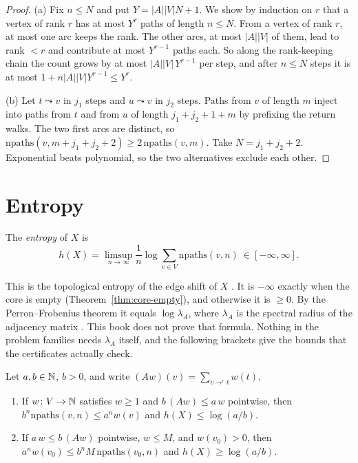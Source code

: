 \begin{proof}
(a) Fix \(n\le N\) and put \(Y=|A||V|N+1\). We show by induction on \(r\) that a vertex of rank
\(r\) has at most \(Y^r\) paths of length \(n\le N\). From a vertex of rank \(r\), at most one
arc keeps the rank. The other arcs, at most \(|A||V|\) of them, lead to rank \(<r\) and
contribute at most \(Y^{r-1}\) paths each. So along the rank-keeping chain the count grows by
at most \(|A||V|\,Y^{r-1}\) per step, and after \(n\le N\) steps it is at most
\(1+n|A||V|Y^{r-1}\le Y^r\).

(b) Let \(t\leadsto v\) in \(j_1\) steps and \(u\leadsto v\) in \(j_2\) steps. Paths from
\(v\) of length \(m\) inject into paths from \(t\) and from \(u\) of length \(j_1+j_2+1+m\) by
prefixing the return walks. The two first arcs are distinct, so
\(\mathrm{npaths}(v,m+j_1+j_2+2)\ge 2\,\mathrm{npaths}(v,m)\). Take \(N=j_1+j_2+2\).
Exponential beats polynomial, so the two alternatives exclude each other.
\end{proof}

\section{Entropy}

\begin{definition}\label{def:entropy}
The \emph{entropy} of \(X\) is
\[
  h(X)=\limsup_{n\to\infty}\frac1n\log\sum_{v\in V}\mathrm{npaths}(v,n)\ \in[-\infty,\infty].
\]
\end{definition}

This is the topological entropy of the edge shift of \(X\) \cite[§4.1]{LM95}. It is
\(-\infty\) exactly when the core is empty (Theorem~\ref{thm:core-empty}), and otherwise it is
\(\ge0\). By the Perron--Frobenius theorem it equals \(\log\lambda_A\), where \(\lambda_A\) is the
spectral radius of the adjacency matrix \cite[Thm.~4.3.1, Thm.~4.4.4]{LM95}. This book does not
prove that formula. Nothing in the problem families needs \(\lambda_A\) itself, and the
following brackets give the bounds that the certificates actually check.

\begin{theorem}\label{thm:brackets}
Let \(a,b\in\mathbb{N}\), \(b>0\), and write \((Aw)(v)=\sum_{v\to^c t}w(t)\).
\begin{enumerate}[label=(\alph*)]
\item If \(w\colon V\to\mathbb{N}\) satisfies \(w\ge1\) and \(b\,(Aw)\le a\,w\) pointwise,
  then \(b^n\mathrm{npaths}(v,n)\le a^n w(v)\) and \(h(X)\le\log(a/b)\).
\item If \(a\,w\le b\,(Aw)\) pointwise, \(w\le M\), and \(w(v_0)>0\), then
  \(a^n w(v_0)\le b^n M\,\mathrm{npaths}(v_0,n)\) and \(h(X)\ge\log(a/b)\).
\end{enumerate}
\end{theorem}

